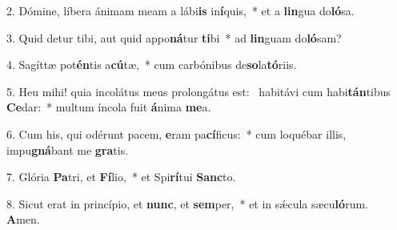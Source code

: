 2. Dómine, líbera ánimam meam a lábi\textbf{is} in\textbf{í}quis,~*  et a \textbf{lin}gua do\textbf{ló}sa.\

3. Quid detur tibi, aut quid appo\textbf{ná}tur \textbf{ti}bi~*  ad \textbf{lin}guam do\textbf{ló}sam?\

4. Sagíttæ pot\textbf{én}tis a\textbf{cú}tæ,~*  cum carbónibus de\textbf{so}la\textbf{tó}riis.\

5. Heu mihi! quia incolátus meus prolongátus est: \dag\  habitávi cum habi\textbf{tán}tibus \textbf{Ce}dar:~*  multum íncola fuit \textbf{á}nima \textbf{me}a.\

6. Cum his, qui odérunt pacem, \textbf{e}ram pa\textbf{cí}ficus:~*  cum loquébar illis, impu\textbf{gná}bant me \textbf{gra}tis.\

7. Glória \textbf{Pa}tri, et \textbf{Fí}lio,~*  et Spi\textbf{rí}tui \textbf{Sanc}to.\

8. Sicut erat in princípio, et \textbf{nunc}, et \textbf{sem}per,~*  et in sǽcula sæcu\textbf{ló}rum. \textbf{A}men.\

